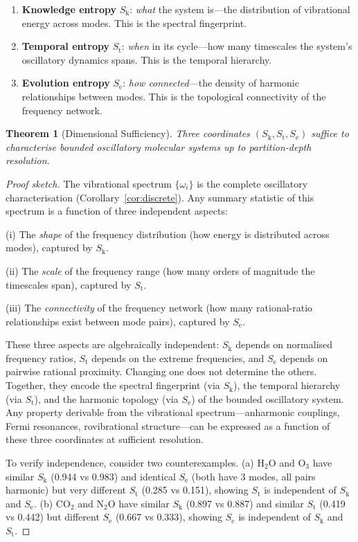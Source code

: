 \documentclass[11pt,a4paper]{article}
\newtheorem{theorem}{Theorem}[section]
\theoremstyle{definition}
\theoremstyle{remark}
\newcommand{\Sk}{S_{\mathrm{k}}}
\newcommand{\St}{S_{\mathrm{t}}}
\newcommand{\Se}{S_{\mathrm{e}}}
\begin{document}
\begin{enumerate}
\item \textbf{Knowledge entropy} $\Sk$: \emph{what} the system is---the distribution of vibrational energy across modes. This is the spectral fingerprint.
\item \textbf{Temporal entropy} $\St$: \emph{when} in its cycle---how many timescales the system's oscillatory dynamics spans. This is the temporal hierarchy.
\item \textbf{Evolution entropy} $\Se$: \emph{how connected}---the density of harmonic relationships between modes. This is the topological connectivity of the frequency network.
\end{enumerate}

\begin{theorem}[Dimensional Sufficiency]
\label{thm:dimensional}
Three coordinates $(\Sk, \St, \Se)$ suffice to characterise bounded oscillatory molecular systems up to partition-depth resolution.
\end{theorem}

\begin{proof}[Proof sketch]
The vibrational spectrum $\{\omega_i\}$ is the complete oscillatory characterisation (Corollary~\ref{cor:discrete}). Any summary statistic of this spectrum is a function of three independent aspects:

(i) The \emph{shape} of the frequency distribution (how energy is distributed across modes), captured by $\Sk$.

(ii) The \emph{scale} of the frequency range (how many orders of magnitude the timescales span), captured by $\St$.

(iii) The \emph{connectivity} of the frequency network (how many rational-ratio relationships exist between mode pairs), captured by $\Se$.

These three aspects are algebraically independent: $\Sk$ depends on normalised frequency ratios, $\St$ depends on the extreme frequencies, and $\Se$ depends on pairwise rational proximity. Changing one does not determine the others. Together, they encode the spectral fingerprint (via $\Sk$), the temporal hierarchy (via $\St$), and the harmonic topology (via $\Se$) of the bounded oscillatory system. Any property derivable from the vibrational spectrum---anharmonic couplings, Fermi resonances, rovibrational structure---can be expressed as a function of these three coordinates at sufficient resolution.

To verify independence, consider two counterexamples. (a) H$_2$O and O$_3$ have similar $\Sk$ (0.944 vs 0.983) and identical $\Se$ (both have 3 modes, all pairs harmonic) but very different $\St$ (0.285 vs 0.151), showing $\St$ is independent of $\Sk$ and $\Se$. (b) CO$_2$ and N$_2$O have similar $\Sk$ (0.897 vs 0.887) and similar $\St$ (0.419 vs 0.442) but different $\Se$ (0.667 vs 0.333), showing $\Se$ is independent of $\Sk$ and $\St$.
\end{proof}
\end{document}
